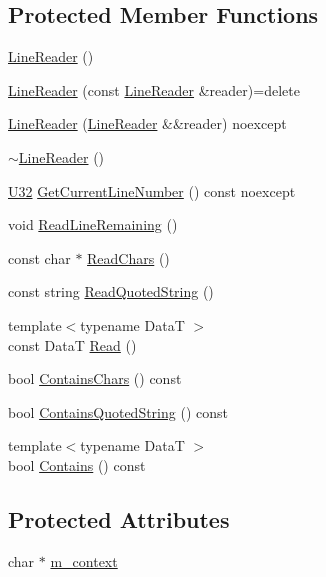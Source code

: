 \subsection*{Protected Member Functions}
\begin{DoxyCompactItemize}
\item 
\hyperlink{classmage_1_1_line_reader_ab4a46321d7ea3ecda2d6390c78a7285b}{Line\+Reader} ()
\item 
\hyperlink{classmage_1_1_line_reader_ae4f871bebae110704b34c0bd88460639}{Line\+Reader} (const \hyperlink{classmage_1_1_line_reader}{Line\+Reader} \&reader)=delete
\item 
\hyperlink{classmage_1_1_line_reader_ae90c546a98e113a48ca1c94b854a4866}{Line\+Reader} (\hyperlink{classmage_1_1_line_reader}{Line\+Reader} \&\&reader) noexcept
\item 
\hyperlink{classmage_1_1_line_reader_ad9753ea392ebe5b3867852d3392fb1e7}{$\sim$\+Line\+Reader} ()
\item 
\hyperlink{namespacemage_a41c104c036fba3756a74e19f793eeaa1}{U32} \hyperlink{classmage_1_1_line_reader_aa0ed768e2799b74f2341c56fc6ac4969}{Get\+Current\+Line\+Number} () const noexcept
\item 
void \hyperlink{classmage_1_1_line_reader_a3a4b99bfef1e8a826d74a01bcc663fcb}{Read\+Line\+Remaining} ()
\item 
const char $\ast$ \hyperlink{classmage_1_1_line_reader_ad915c1a17549c7758c10f0b6db7e5611}{Read\+Chars} ()
\item 
const string \hyperlink{classmage_1_1_line_reader_ae9a7547d01b29c3237b198444d4f3aef}{Read\+Quoted\+String} ()
\item 
{\footnotesize template$<$typename DataT $>$ }\\const DataT \hyperlink{classmage_1_1_line_reader_aa1ba5aa332e49bdd63ef4ee4021120fd}{Read} ()
\item 
bool \hyperlink{classmage_1_1_line_reader_a0369e06fa3b38ecb22ffd5892759225f}{Contains\+Chars} () const
\item 
bool \hyperlink{classmage_1_1_line_reader_a99b4fa47fc341ad4fda112ea9505efcb}{Contains\+Quoted\+String} () const
\item 
{\footnotesize template$<$typename DataT $>$ }\\bool \hyperlink{classmage_1_1_line_reader_a3401db2b0ecd15d8048a1b321eceb77a}{Contains} () const
\end{DoxyCompactItemize}
\subsection*{Protected Attributes}
\begin{DoxyCompactItemize}
\item 
char $\ast$ \hyperlink{classmage_1_1_line_reader_a2f1cfe313dc89741386178e63a6b8b0c}{m\+\_\+context}
\end{DoxyCompactItemize}
